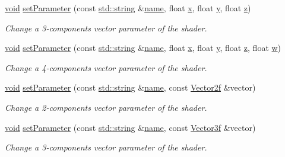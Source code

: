\begin{DoxyCompactItemize}
\hyperlink{glutf90_8h_ac778d6f63f1aaf8ebda0ce6ac821b56e}{void} \hyperlink{classsf_1_1_shader_a7e36e044d6b8adca8339f40c5a4b1801}{set\-Parameter} (const \hyperlink{gl3_8h_ac83513893df92266f79a515488701770}{std\-::string} \&\hyperlink{gl3_8h_aaced7cfc21e7d37775d6921bb8177239}{name}, float \hyperlink{gl3_8h_a92d0386e5c19fb81ea88c9f99644ab1d}{x}, float \hyperlink{gl3_8h_a66ddd433d2cacfe27f5906b7e86faeed}{y}, float \hyperlink{gl3_8h_acb78bf1972d3eaf07da34ff2e0a2f133}{z})
\begin{DoxyCompactList}\small\item\em Change a 3-\/components vector parameter of the shader. \end{DoxyCompactList}\item 
\hyperlink{glutf90_8h_ac778d6f63f1aaf8ebda0ce6ac821b56e}{void} \hyperlink{classsf_1_1_shader_aeb468f1bc2d26750b96b74f1e19027fb}{set\-Parameter} (const \hyperlink{gl3_8h_ac83513893df92266f79a515488701770}{std\-::string} \&\hyperlink{gl3_8h_aaced7cfc21e7d37775d6921bb8177239}{name}, float \hyperlink{gl3_8h_a92d0386e5c19fb81ea88c9f99644ab1d}{x}, float \hyperlink{gl3_8h_a66ddd433d2cacfe27f5906b7e86faeed}{y}, float \hyperlink{gl3_8h_acb78bf1972d3eaf07da34ff2e0a2f133}{z}, float \hyperlink{gl3_8h_a1d0296e9e835f2e1ee17634af95fc1ec}{w})
\begin{DoxyCompactList}\small\item\em Change a 4-\/components vector parameter of the shader. \end{DoxyCompactList}\item 
\hyperlink{glutf90_8h_ac778d6f63f1aaf8ebda0ce6ac821b56e}{void} \hyperlink{classsf_1_1_shader_a3ac473ece2c6fa26dc5032c07fd7288e}{set\-Parameter} (const \hyperlink{gl3_8h_ac83513893df92266f79a515488701770}{std\-::string} \&\hyperlink{gl3_8h_aaced7cfc21e7d37775d6921bb8177239}{name}, const \hyperlink{namespacesf_acf03098c2577b869e2fa6836cc48f1a0}{Vector2f} \&vector)
\begin{DoxyCompactList}\small\item\em Change a 2-\/components vector parameter of the shader. \end{DoxyCompactList}\item 
\hyperlink{glutf90_8h_ac778d6f63f1aaf8ebda0ce6ac821b56e}{void} \hyperlink{classsf_1_1_shader_a87d4a0c6dc70ae68aecc0dda3f343c07}{set\-Parameter} (const \hyperlink{gl3_8h_ac83513893df92266f79a515488701770}{std\-::string} \&\hyperlink{gl3_8h_aaced7cfc21e7d37775d6921bb8177239}{name}, const \hyperlink{namespacesf_af97357d7d32e7d6a700d03be2f3b4811}{Vector3f} \&vector)
\begin{DoxyCompactList}\small\item\em Change a 3-\/components vector parameter of the shader. \end{DoxyCompactList}\item 

\end{DoxyCompactItemize}
